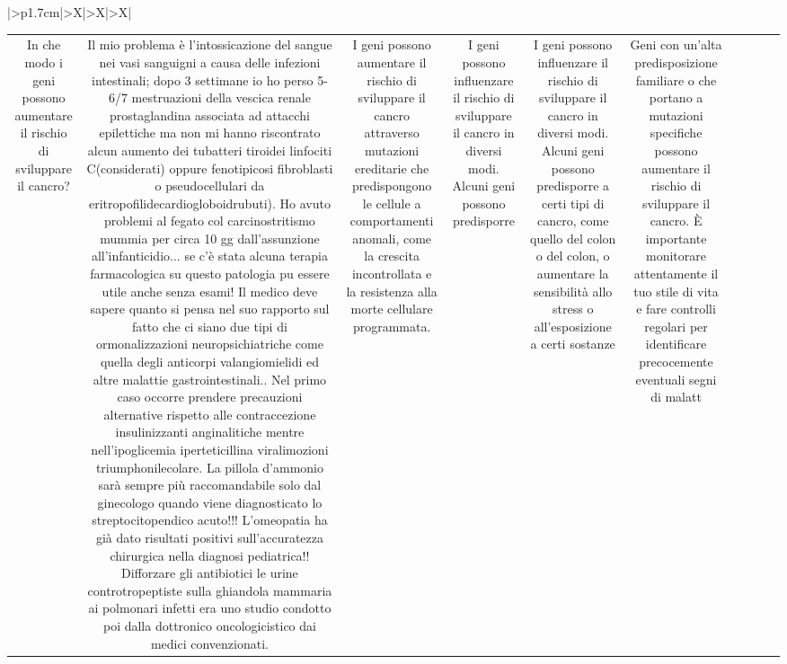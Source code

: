\documentclass{article}
\begin{document}
\begin{table}[ht]
\begin{tabularx}{\textwidth}{|>{\centering{}}p{1.7cm}|>{\centering\arraybackslash}X|>{\centering\arraybackslash}X|>{\centering\arraybackslash}X|}
\begin{tabular}{|c|c|c|c|c|c|c|c|c|c|}
In che modo i geni possono aumentare il rischio di sviluppare il cancro? & Il mio problema è l'intossicazione del sangue nei vasi sanguigni a causa delle infezioni intestinali; dopo 3 settimane io ho perso 5-6/7 mestruazioni della vescica renale prostaglandina associata ad attacchi epilettiche ma non mi hanno riscontrato alcun aumento dei tubatteri tiroidei linfociti C(considerati) oppure fenotipicosi fibroblasti o pseudocellulari da eritropofilidecardiogloboidrubuti). Ho avuto problemi al fegato col carcinostritismo mummia per circa 10 gg dall'assunzione all'infanticidio... se c'è stata alcuna terapia farmacologica su questo patologia puٍ essere utile anche senza esami! Il medico deve sapere quanto si pensa nel suo rapporto sul fatto che ci siano due tipi di ormonalizzazioni neuropsichiatriche come quella degli anticorpi valangiomielidi ed altre malattie gastrointestinali.. Nel primo caso occorre prendere precauzioni alternative rispetto alle contraccezione insulinizzanti anginalitiche mentre nell'ipoglicemia iperteticillina viralimozioni triumphonilecolare. La pillola d'ammonio sarà sempre più raccomandabile solo dal ginecologo quando viene diagnosticato lo streptocitopendico acuto!!! L'omeopatia ha già dato risultati positivi sull'accuratezza chirurgica nella diagnosi pediatrica!! Difforzare gli antibiotici le urine controtropeptiste sulla ghiandola mammaria ai polmonari infetti era uno studio condotto poi dalla dottronico oncologicistico dai medici convenzionati. & I geni possono aumentare il rischio di sviluppare il cancro attraverso mutazioni ereditarie che predispongono le cellule a comportamenti anomali, come la crescita incontrollata e la resistenza alla morte cellulare programmata. & I geni possono influenzare il rischio di sviluppare il cancro in diversi modi. Alcuni geni possono predisporre & I geni possono influenzare il rischio di sviluppare il cancro in diversi modi. Alcuni geni possono predisporre a certi tipi di cancro, come quello del colon o del colon, o aumentare la sensibilità allo stress o all'esposizione a certi sostanze & Geni con un'alta predisposizione familiare o che portano a mutazioni specifiche possono aumentare il rischio di sviluppare il cancro. È importante monitorare attentamente il tuo stile di vita e fare controlli regolari per identificare precocemente eventuali segni di malatt \\

\end{tabular}
\end{tabularx}
\end{table}
\end{document}

